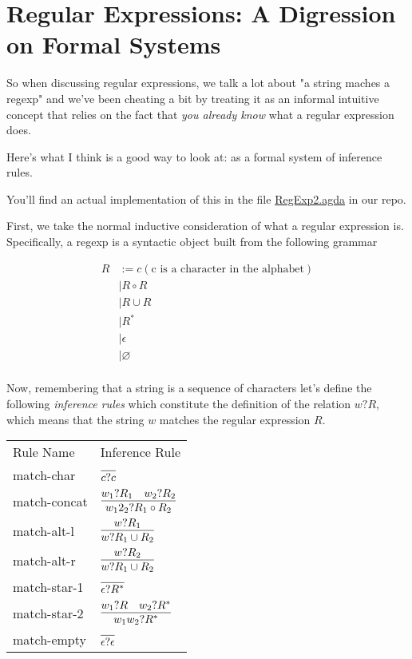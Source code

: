 \documentclass[11pt]{article}
\begin{document}
\section{Regular Expressions: A Digression on Formal Systems}
\label{sec-5}
So when discussing regular expressions, we talk a lot about "a string maches a regexp" and we've been cheating a bit by treating it as an informal intuitive concept that relies on the fact that \emph{you already know} what a regular expression does. 

Here's what I think is a good way to look at: as a formal system of inference rules.

You'll find an actual implementation of this in the file \href{https://github.com/clarissalittler/cs311/blob/master/agda/RegExp2.agda}{RegExp2.agda} in our repo. 

First, we take the normal inductive consideration of what a regular expression is. Specifically, a regexp is a syntactic object built from the following grammar 

\begin{align*}
  R &:= c (\text{c is a character in the alphabet}) \\
    &| R \circ R \\
    &| R \cup R \\
    &| R^* \\
    &| \epsilon \\
    &| \varnothing \\
\end{align*}

Now, remembering that a string is a sequence of characters let's define the following \emph{inference rules} which constitute the definition of the relation $w ? R$, which means that the string $w$ matches the regular expression $R$.

\begin{center}
\begin{tabular}{ll}
Rule Name & Inference Rule\\
match-char & $\infer{c ? c}{}$\\
match-concat & $\infer{w_1 2_2 ? R_1 \circ R_2}{w_1 ? R_1 & w_2 ? R_2}$\\
match-alt-l & $\infer{w ? R_1 \cup R_2}{w ? R_1}$\\
match-alt-r & $\infer{w ? R_1 \cup R_2}{w ? R_2}$\\
match-star-1 & $\infer{\epsilon ? R^*}{}$\\
match-star-2 & $\infer{w_1 w_2 ? R^*}{w_1 ? R & w_2 ? R^*}$\\
match-empty & $\infer{\epsilon ? \epsilon}{}$\\
\end{tabular}
\end{center}
\end{document}
